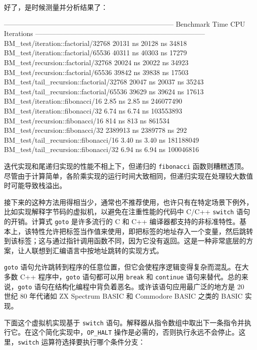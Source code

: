 好了，是时候测量并分析结果了：

\begin{codebox}[text]
--------------------------------------------------------------------------
Benchmark                                        Time             CPU   Iterations
--------------------------------------------------------------------------
BM_test/iteration::factorial/32768           20131 ns        20128 ns        34818
BM_test/iteration::factorial/65536           40311 ns        40303 ns        17279
BM_test/recursion::factorial/32768           20024 ns        20022 ns        34923
BM_test/recursion::factorial/65536           39842 ns        39838 ns        17503
BM_test/tail_recursion::factorial/32768      20047 ns        20037 ns        35243
BM_test/tail_recursion::factorial/65536      39629 ns        39624 ns        17613
BM_test/iteration::fibonacci/16               2.85 ns         2.85 ns    246077490
BM_test/iteration::fibonacci/32               6.74 ns         6.74 ns    103553893
BM_test/recursion::fibonacci/16                814 ns          813 ns       861534
BM_test/recursion::fibonacci/32            2389913 ns      2389778 ns          292
BM_test/tail_recursion::fibonacci/16          3.40 ns         3.40 ns    181188049
BM_test/tail_recursion::fibonacci/32          6.94 ns         6.94 ns    100046816
\end{codebox}

\label{idx:1298}
迭代实现和尾递归实现的性能不相上下，但递归的 \texttt{fibonacci} 函数则糟糕透顶。尽管由于计算简单，各阶乘实现的运行时间大致相同，但递归实现在处理较大数值时可能导致栈溢出。

接下来的这种方法用得相当少，通常也不推荐使用，也许只有在特定场景下例外，比如实现解释字节码的虚拟机，以避免在注重性能的代码中 C/C++ \texttt{switch} 语句的开销。计算式 \texttt{goto} 是许多流行的 C 和 C++ 编译器都支持的非标准特性。基本上，该特性允许把标签当作值来使用，即把标签的地址存入一个变量，然后跳转到该标签；这与通过指针调用函数不同，因为它没有返回。这是一种非常底层的方案，让人联想到汇编语言中按地址跳转的实现方式。

\texttt{goto} 语句允许跳转到程序的任意位置，但它会使程序逻辑变得复杂而混乱。在大多数 C++ 程序中，\texttt{goto} 语句都可以用 \texttt{break} 和 \texttt{continue} 语句来替代。总的来说，\texttt{goto} 语句在结构化编程中背负着恶名。或许该语句应用最广泛的地方是 20 世纪 80 年代诸如 ZX Spectrum BASIC 和 Commodore BASIC 之类的 BASIC 实现。

\label{idx:1299}
下面这个虚拟机实现基于 \texttt{switch} 语句。解释器从指令数组中取出下一条指令并执行它。在这个简化实现中，\texttt{OP\_HALT} 操作是必需的，否则执行永远不会停止。这里，\texttt{switch} 运算符选择要执行哪个条件分支：

